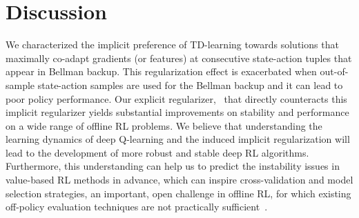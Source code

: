 \documentclass{article}
\begin{document}
\section{Discussion}
\label{sec:discussion}
We characterized the implicit preference of TD-learning towards solutions that maximally co-adapt gradients (or features) at consecutive state-action tuples that appear in Bellman backup. This regularization effect is exacerbated when out-of-sample
state-action samples are used for the Bellman backup and it can lead to poor policy performance. Our explicit regularizer, \methodname\ that directly counteracts this implicit regularizer yields substantial improvements on stability and performance on a wide range of offline RL problems. We believe that understanding the learning dynamics of deep Q-learning and the induced implicit regularization will lead to the development of more robust and stable deep RL algorithms. Furthermore, this understanding can help us to predict the instability issues in value-based RL methods in advance, which can inspire cross-validation and model selection strategies, an important, open challenge in offline RL, for which existing off-policy evaluation techniques are not practically sufficient~\citep{fu2021benchmarks}. 







\onecolumn
\appendix
\newpage

\end{document}
